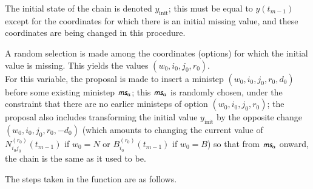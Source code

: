 \documentclass[a4paper,12pt,fleqn]{article}
\newcommand{\ms}{\textsl{\textsf{\small ms}}} %
\begin{document}
The initial state of the chain is denoted $y_{\text{init}}$;
this must be equal to $y(t_{m-1})$ except for the coordinates
for which there is an initial missing value, and these
coordinates are being changed in this procedure.

A random selection is made among the coordinates (options) for which
the initial value is missing.
This yields the values $(w_0,i_0,j_0,r_0)$.\\
For this variable, the proposal is made to insert
a ministep  $(w_0,i_0,j_0,r_0,d_0)$
before some existing ministep $\ms_a$;
this $\ms_a$ is randomly chosen, under the constraint
that there are no earlier ministeps of option  $(w_0,i_0,j_0,r_0)$;
the proposal also includes transforming the initial value
$y_{\text{init}}$
by the opposite change $(w_0,i_0,j_0,r_0,-d_0)$
(which amounts to changing  the current value of
$N_{i_0j_0}^{(r_0)}(t_{m-1})$ if $w_0 = N$
or $B_{i_0}^{(r_0)}(t_{m-1})$ if $w_0 = B$)
so that from $\ms_a$ onward, the chain is the same as it used to be.

The steps taken in the function are as follows.
\end{document}
